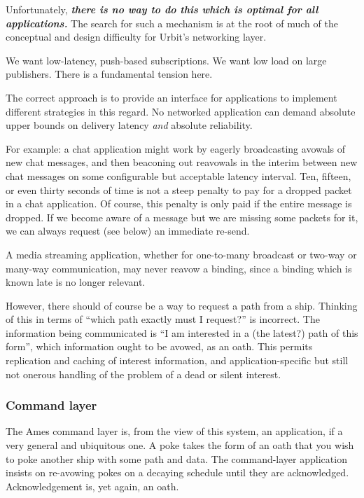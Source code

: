 Unfortunately, \textbf{\emph{there is no way to do this which is optimal
for all applications.}} The search for such a mechanism is at the root
of much of the conceptual and design difficulty for Urbit's networking
layer.

We want low-latency, push-based subscriptions. We want low load on large
publishers. There is a fundamental tension here.

The correct approach is to provide an interface for applications to
implement different strategies in this regard. No networked application
can demand absolute upper bounds on delivery latency \emph{and} absolute
reliability.

For example: a chat application might work by eagerly broadcasting
avowals of new chat messages, and then beaconing out reavowals in the
interim between new chat messages on some configurable but acceptable
latency interval. Ten, fifteen, or even thirty seconds of time is not a
steep penalty to pay for a dropped packet in a chat application. Of
course, this penalty is only paid if the entire message is dropped. If
we become aware of a message but we are missing some packets for it, we
can always request (see below) an immediate re-send.

A media streaming application, whether for one-to-many broadcast or
two-way or many-way communication, may never reavow a binding, since a
binding which is known late is no longer relevant.

However, there should of course be a way to request a path from a ship.
Thinking of this in terms of ``which path exactly must I request?'' is
incorrect. The information being communicated is ``I am interested in a
(the latest?) path of this form'', which information ought to be avowed,
as an oath. This permits replication and caching of interest
information, and application-specific but still not onerous handling of
the problem of a dead or silent interest.

\subsubsection{Command layer}

The Ames command layer is, from the view of this system, an application,
if a very general and ubiquitous one. A poke takes the form of an oath
that you wish to poke another ship with some path and data. The
command-layer application insists on re-avowing pokes on a decaying
schedule until they are acknowledged. Acknowledgement is, yet again, an
oath.

